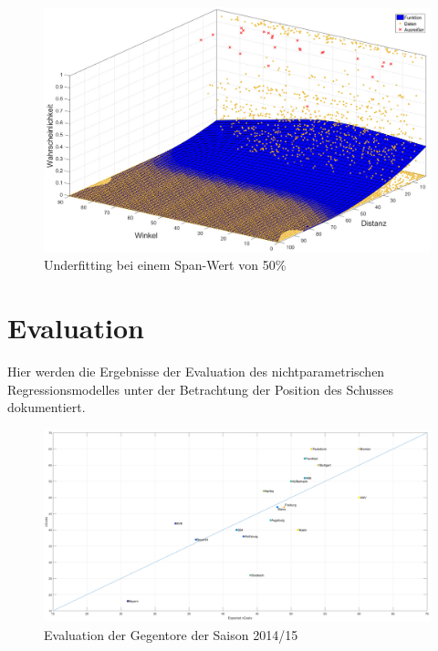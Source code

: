 \begin{figure}[H]
\centering
\includegraphics[scale=0.34]{se-wa-jpg/splinewdTL}
\caption{Underfitting bei einem Span-Wert von 50\%}
\label{splinewdTL}
\end{figure}

\chapter{Evaluation}

Hier werden die Ergebnisse der Evaluation des nichtparametrischen Regressionsmodelles unter der Betrachtung der Position des Schusses dokumentiert. 

\begin{figure}
\centering
\includegraphics[scale=0.3]{se-wa-jpg/cGoals_correlation_14_15}
\caption{Evaluation der Gegentore der Saison 2014/15}
\label{lines}
\end{figure}

